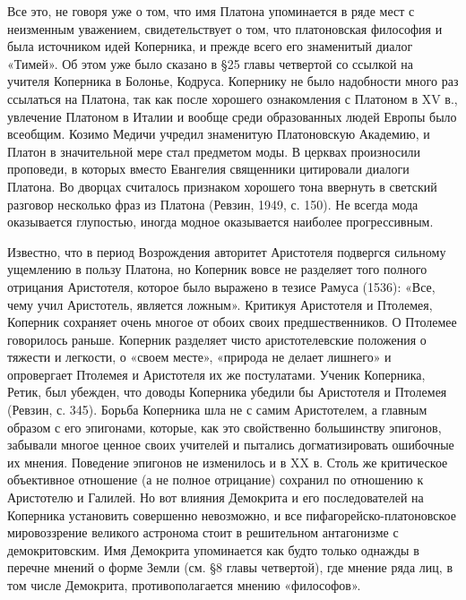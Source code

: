 Все это, не говоря уже о том, что имя Платона упоминается в ряде мест
с неизменным уважением, свидетельствует о том, что платоновская
философия и была источником идей Коперника, и прежде всего его
знаменитый диалог «Тимей». Об этом уже было сказано в §25 главы
четвертой со ссылкой на учителя Коперника в Болонье, Кодруса.
Копернику не было надобности много раз ссылаться на Платона, так как
после хорошего ознакомления с Платоном в XV в., увлечение Платоном в
Италии и вообще среди образованных людей Европы было всеобщим. Козимо
Медичи учредил знаменитую Платоновскую Академию, и Платон в
значительной мере стал предметом моды. В церквах произносили
проповеди, в которых вместо Евангелия священники цитировали диалоги
Платона. Во дворцах считалось признаком хорошего тона ввернуть в
светский разговор несколько фраз из Платона (Ревзин, 1949, с. 150). Не
всегда мода оказывается глупостью, иногда модное оказывается наиболее
прогрессивным.

Известно, что в период Возрождения авторитет Аристотеля подвергся
сильному ущемлению в пользу Платона, но Коперник вовсе не разделяет
того полного отрицания Аристотеля, которое было выражено в тезисе
Рамуса (1536): «Все, чему учил Аристотель, является ложным». Критикуя
Аристотеля и Птолемея, Коперник сохраняет очень многое от обоих своих
предшественников. О Птолемее говорилось раньше. Коперник разделяет
чисто аристотелевские положения о тяжести и легкости, о «своем месте»,
«природа не делает лишнего» и опровергает Птолемея и Аристотеля их же
постулатами. Ученик Коперника, Ретик, был убежден, что доводы
Коперника убедили бы Аристотеля и Птолемея (Ревзин, с. 345). Борьба
Коперника шла не с самим Аристотелем, а главным образом с его
эпигонами, которые, как это свойственно большинству эпигонов, забывали
многое ценное своих учителей и пытались догматизировать ошибочные их
мнения. Поведение эпигонов не изменилось и в XX в. Столь же
критическое объективное отношение (а не полное отрицание) сохранил по
отношению к Аристотелю и Галилей. Но вот влияния Демокрита и его
последователей на Коперника установить совершенно невозможно, и все
пифагорейско-платоновское мировоззрение великого астронома стоит в
решительном антагонизме с демокритовским. Имя Демокрита упоминается
как будто только однажды в перечне мнений о форме Земли (см. §8 главы
четвертой), где мнение ряда лиц, в том числе Демокрита,
противополагается мнению «философов».


